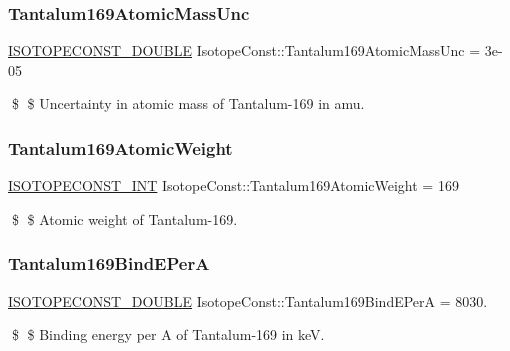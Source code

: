\subsubsection{\texorpdfstring{Tantalum169\+Atomic\+Mass\+Unc}{Tantalum169AtomicMassUnc}}
{\footnotesize\ttfamily \mbox{\hyperlink{group___isotope_const-_macros_ga8f45a7272ce02c0b4c65c44636ed719a}{I\+S\+O\+T\+O\+P\+E\+C\+O\+N\+S\+T\+\_\+\+D\+O\+U\+B\+LE}} Isotope\+Const\+::\+Tantalum169\+Atomic\+Mass\+Unc = 3e-\/05}

\$ \$ Uncertainty in atomic mass of Tantalum-\/169 in amu. \mbox{\label{group___isotope_const-_tantalum-_ta169_ga9d1465866b3a032990a5a1b03786e790}} 
\subsubsection{\texorpdfstring{Tantalum169\+Atomic\+Weight}{Tantalum169AtomicWeight}}
{\footnotesize\ttfamily \mbox{\hyperlink{group___isotope_const-_macros_ga5f18360b3e99483a35c32d789e62621c}{I\+S\+O\+T\+O\+P\+E\+C\+O\+N\+S\+T\+\_\+\+I\+NT}} Isotope\+Const\+::\+Tantalum169\+Atomic\+Weight = 169}

\$ \$ Atomic weight of Tantalum-\/169. \mbox{\label{group___isotope_const-_tantalum-_ta169_gab2054b1c7355a56060c422975b6abc81}} 
\subsubsection{\texorpdfstring{Tantalum169\+Bind\+E\+PerA}{Tantalum169BindEPerA}}
{\footnotesize\ttfamily \mbox{\hyperlink{group___isotope_const-_macros_ga8f45a7272ce02c0b4c65c44636ed719a}{I\+S\+O\+T\+O\+P\+E\+C\+O\+N\+S\+T\+\_\+\+D\+O\+U\+B\+LE}} Isotope\+Const\+::\+Tantalum169\+Bind\+E\+PerA = 8030.}

\$ \$ Binding energy per A of Tantalum-\/169 in keV. \mbox{\label{group___isotope_const-_tantalum-_ta169_gaa0024436c4db45b83611a983f5cbde47}} 
